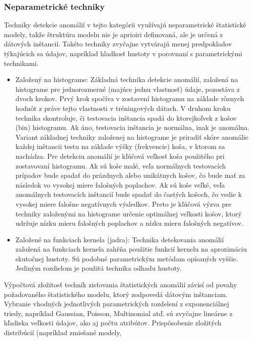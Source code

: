 \subsubsection{Neparametrické techniky}
Techniky detekcie anomálií v tejto kategórii využívajú neparametrické štatistické modely, takže štruktúra modelu nie je aprioiri definovaná, ale je určená
z dátových inštancií. Takéto techniky zvyčajne vytvárajú menej predpokladov týkajúcich sa údajov,
napríklad hladkosť hustoty v porovnaní s parametrickými technikami.
\begin{itemize}
    \item Založený na histograme: Základná technika detekcie anomálií, založená na histograme pre jednorozmerné (majúce jednu vlastnosť) údaje, pozostáva z
dvoch krokov. Prvý krok spočíva v zostavení histogramu na základe rôznych hodnôt
z práve tejto vlastnosti v tréningových dátach. V druhom kroku technika skontroluje, či
testovacia inštancia spadá do ktorejkoľvek z košov (bin) histogramu. Ak áno, testovacia inštancia
je normálna, inak je anomálna. Variant základnej techniky založenej na histograme
je priradiť skóre anomálie každej inštancii testu na základe výšky (frekvencie)
koša, v ktorom sa nachádza.
Pre detekciu anomálií je kľúčová veľkosť koša použitého pri zostavovaní histogramu. Ak sú koše  malé, veľa normálnych testovacích prípadov bude spadať do prázdnych alebo unikátnych košov, čo bude mať za následok vo vysokej miere falošných poplachov. Ak sú koše veľké, veľa anomálnych testovacích inštancií
bude spadať do častých košoch, čo vedie k vysokej miere falošne negatívnych výsledkov. Preto je kľúčová výzva pre techniky založenými na histograme určenie optimálnej veľkosti košov, ktorý udržuje nízku mieru falošných poplachov a nízku mieru falošných negatívov.

\item Založené na funkciach kernela (jadra): Technika detekovania anomálií založená na funkciach kernela  zahŕňa použitie funkcií kernelu na aproximáciu skutočnej hustoty. Sú podobné parametrickým metódam opísaných vyššie. Jediným rozdielom je použitá technika odhadu hustoty.

\end{itemize} \par
Výpočtová zložitosť techník zisťovania štatistických anomálií závisí od povahy požadovaného štatistického modelu, ktorý zodpovedá dátovým inštanciam. Vybranie vhodných jednotlivých parametrických rozdelení z exponenciálnej triedy,
napríklad Gaussian, Poisson, Multinomial atď. sú zvyčajne lineárne z hľadiska veľkosti údajov, ako aj počtu atribútov. Prispôsobenie zložitých distribúcií (napríklad zmiešané modely,
